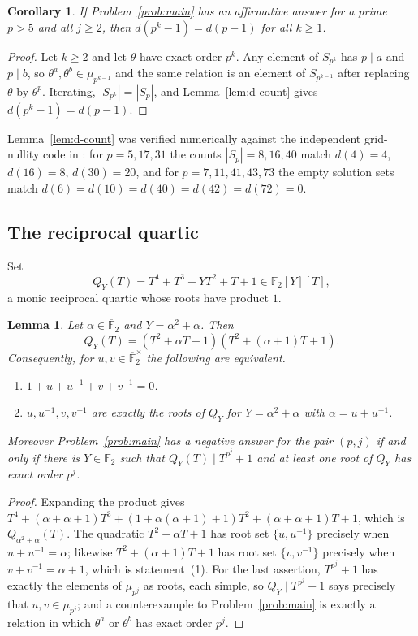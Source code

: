 \documentclass[a4paper]{article}
\newtheorem{lemma}[theorem]{Lemma}
\newtheorem{corollary}[theorem]{Corollary}
\newcommand{\F}{\mathbb{F}}
\newcommand{\abs}[1]{\left|#1\right|}
\begin{document}
\begin{corollary}\label{cor:reduction}
	If Problem~\ref{prob:main} has an affirmative answer for a prime $p>5$
	and all $j\geq2$, then $d(p^k-1)=d(p-1)$ for all $k\geq1$.
\end{corollary}

\begin{proof}
	Let $k\geq2$ and let $\theta$ have exact order $p^k$.
	Any element of $S_{p^k}$ has $p\mid a$ and $p\mid b$, so
	$\theta^a,\theta^b\in\mu_{p^{k-1}}$ and the same relation is an element
	of $S_{p^{k-1}}$ after replacing $\theta$ by $\theta^{p}$.
	Iterating, $\abs{S_{p^k}}=\abs{S_{p}}$, and Lemma~\ref{lem:d-count}
	gives $d(p^k-1)=d(p-1)$.
\end{proof}

Lemma~\ref{lem:d-count} was verified numerically against the independent
grid-nullity code in : for $p=5,17,31$ the counts
$\abs{S_p}=8,16,40$ match $d(4)=4$, $d(16)=8$, $d(30)=20$, and for
$p=7,11,41,43,73$ the empty solution sets match
$d(6)=d(10)=d(40)=d(42)=d(72)=0$.

\subsection{The reciprocal quartic}

Set
\[
	Q_Y(T)=T^4+T^3+YT^2+T+1\in\overline{\F}_2[Y][T],
\]
a monic reciprocal quartic whose roots have product $1$.

\begin{lemma}\label{lem:quartic}
	Let $\alpha\in\overline{\F}_2$ and $Y=\alpha^2+\alpha$.
	Then
	\[
		Q_Y(T)=\left(T^2+\alpha T+1\right)\left(T^2+(\alpha+1)T+1\right).
	\]
	Consequently, for $u,v\in\overline{\F}_2^{\times}$ the following are
	equivalent.
	\begin{enumerate}
		\item $1+u+u^{-1}+v+v^{-1}=0$.
		\item $u,u^{-1},v,v^{-1}$ are exactly the roots of $Q_Y$ for
		      $Y=\alpha^2+\alpha$ with $\alpha=u+u^{-1}$.
	\end{enumerate}
	Moreover Problem~\ref{prob:main} has a negative answer for the pair
	$(p,j)$ if and only if there is $Y\in\overline{\F}_2$ such that
	$Q_Y(T)\mid T^{p^j}+1$ and at least one root of $Q_Y$ has exact order
	$p^{j}$.
\end{lemma}

\begin{proof}
	Expanding the product gives
	$T^4+(\alpha+\alpha+1)T^3+(1+\alpha(\alpha+1)+1)T^2+(\alpha+\alpha+1)T+1$,
	which is $Q_{\alpha^2+\alpha}(T)$.
	The quadratic $T^2+\alpha T+1$ has root set $\{u,u^{-1}\}$ precisely
	when $u+u^{-1}=\alpha$; likewise $T^2+(\alpha+1)T+1$ has root set
	$\{v,v^{-1}\}$ precisely when $v+v^{-1}=\alpha+1$, which is
	statement~(1).
	For the last assertion, $T^{p^j}+1$ has exactly the elements of
	$\mu_{p^j}$ as roots, each simple, so $Q_Y\mid T^{p^j}+1$ says
	precisely that $u,v\in\mu_{p^j}$; and a counterexample to
	Problem~\ref{prob:main} is exactly a relation in which $\theta^a$ or
	$\theta^b$ has exact order $p^j$.
\end{proof}
\end{document}

